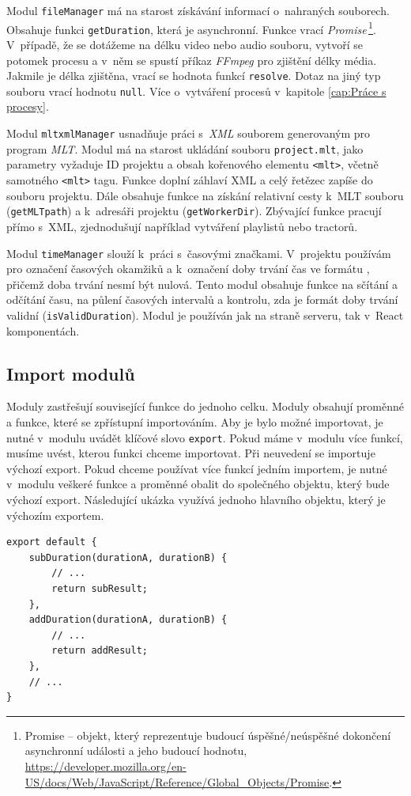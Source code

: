Modul \texttt{fileManager} má na starost získávání informací o~nahraných souborech. Obsahuje funkci \texttt{getDuration}, která je asynchronní. Funkce vrací \textit{Promise}\,\footnote{Promise -- objekt, který reprezentuje budoucí úspěšné/neúspěšné dokončení asynchronní události a jeho budoucí hodnotu, \url{https://developer.mozilla.org/en-US/docs/Web/JavaScript/Reference/Global_Objects/Promise}.}. V~případě, že se dotážeme na délku video nebo audio souboru, vytvoří se potomek procesu a v~něm se spustí příkaz \textit{FFmpeg} pro zjištění délky média. Jakmile je délka zjištěna, vrací se hodnota funkcí \texttt{resolve}. Dotaz na jiný typ souboru vrací hodnotu \texttt{null}. Více o~vytváření procesů v~kapitole \ref{cap:Práce s procesy}.

Modul \texttt{mltxmlManager} usnadňuje práci s~\textit{XML} souborem generovaným pro program \textit{MLT}. Modul má na starost ukládání souboru \texttt{project.mlt}, jako parametry vyžaduje ID projektu a obsah kořenového elementu \texttt{<mlt>}, včetně samotného \texttt{<mlt>} tagu. Funkce doplní záhlaví XML a celý řetězec zapíše do souboru projektu. Dále obsahuje funkce na získání relativní cesty k~MLT souboru (\texttt{getMLTpath}) a k~adresáři projektu (\texttt{getWorkerDir}). Zbývající funkce pracují přímo s~XML, zjednodušují například vytváření playlistů nebo tractorů.

Modul \texttt{timeManager} slouží k~práci s~časovými značkami. V~projektu používám pro označení časových okamžiků a k~označení doby trvání čas ve formátu , přičemž doba trvání nesmí být nulová. Tento modul obsahuje funkce na sčítání a odčítání času, na půlení časových intervalů a kontrolu, zda je formát doby trvání validní (\texttt{isValidDuration}). Modul je používán jak na straně serveru, tak v~React komponentách.

\subsection{Import modulů}
Moduly zastřešují související funkce do jednoho celku. Moduly obsahují proměnné a funkce, které se zpřístupní importováním. Aby je bylo možné importovat, je nutné v~modulu uvádět klíčové slovo \texttt{export}. Pokud máme v~modulu více funkcí, musíme uvést, kterou funkci chceme importovat. Při neuvedení se importuje výchozí export. Pokud chceme používat více funkcí jedním importem, je nutné v~modulu veškeré funkce a proměnné obalit do společného objektu, který bude výchozí export. Následující ukázka využívá jednoho hlavního objektu, který je výchozím exportem.
\begin{lstlisting}[style=JavaScript]
export default {
    subDuration(durationA, durationB) {
        // ...
        return subResult;
    },
    addDuration(durationA, durationB) {
        // ...
        return addResult;
    },
    // ...
}
\end{lstlisting}

